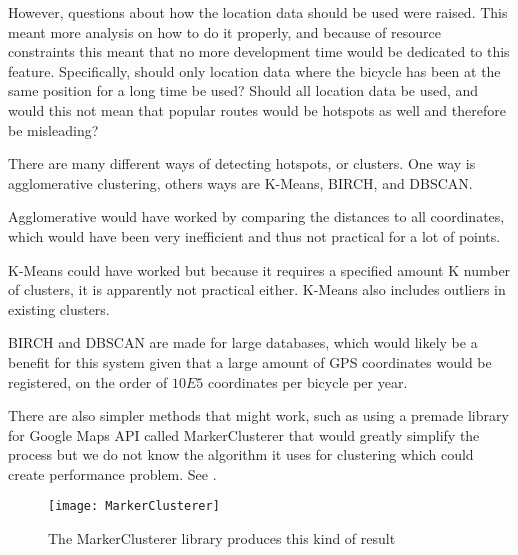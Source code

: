However, questions about how the location data should be used were raised.
This meant more analysis on how to do it properly, and because of resource constraints this meant that no more development time would be dedicated to this feature. 
Specifically, should only location data where the bicycle has been at the same position for a long time be used? 
Should all location data be used, and would this not mean that popular routes would be hotspots as well and therefore be misleading? 

There are many different ways of detecting hotspots, or clusters. One way is agglomerative clustering, others ways are K-Means, BIRCH, and DBSCAN.

Agglomerative would have worked by comparing the distances to all coordinates, which would have been very inefficient and thus not practical for a lot of points. 

K-Means could have worked but because it requires a specified amount K number of clusters, it is apparently not practical either. K-Means also includes outliers in existing clusters.

BIRCH and DBSCAN are made for large databases, which would likely be a benefit for this system given that a large amount of GPS coordinates would be registered, on the order of $10E5$ coordinates per bicycle per year. 

There are also simpler methods that might work, such as using a premade library for Google Maps API called MarkerClusterer that would greatly simplify the process but we do not know the algorithm it uses for clustering which could create performance problem. See .

\begin{figure}[h]
\begin{center}
\texttt{[image: MarkerClusterer]}
\caption{The MarkerClusterer library produces this kind of result}
\label{fig:markerclusterer}
\end{center}
\end{figure}